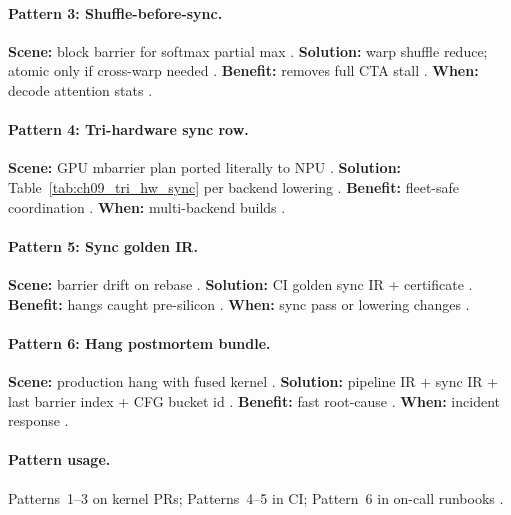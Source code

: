 \paragraph{Pattern 3: Shuffle-before-sync.}
\textbf{Scene:} block barrier for softmax partial max \citep{dao2022flashattention,shah2024flashattention3}.
\textbf{Solution:} warp shuffle reduce; atomic only if cross-warp needed \citep{patel2025llminference,memoryfloor2026}.
\textbf{Benefit:} removes full CTA stall \citep{taxbreak2026,yirage2026}.
\textbf{When:} decode attention stats \citep{kwon2023vllm}.

\paragraph{Pattern 4: Tri-hardware sync row.}
\textbf{Scene:} GPU mbarrier plan ported literally to NPU \citep{amd2024xdna,taxbreak2026}.
\textbf{Solution:} Table~\ref{tab:ch09_tri_hw_sync} per backend lowering \citep{yirage2026,patel2025llminference}.
\textbf{Benefit:} fleet-safe coordination \citep{chen2020compilerbasedhardw,wu2024mirage}.
\textbf{When:} multi-backend builds \citep{mpk2025}.

\paragraph{Pattern 5: Sync golden IR.}
\textbf{Scene:} barrier drift on rebase \citep{yirage2026,shah2024flashattention3}.
\textbf{Solution:} CI golden sync IR + certificate \citep{wu2024mirage,chen2020compilerbasedhardw}.
\textbf{Benefit:} hangs caught pre-silicon \citep{taxbreak2026,mpk2025}.
\textbf{When:} sync pass or lowering changes \citep{nvidia2022hopper,amd2024aie}.

\paragraph{Pattern 6: Hang postmortem bundle.}
\textbf{Scene:} production hang with fused kernel \citep{taxbreak2026,patel2025llminference}.
\textbf{Solution:} pipeline IR + sync IR + last barrier index + CFG bucket id \citep{yirage2026,shah2024flashattention3}.
\textbf{Benefit:} fast root-cause \citep{semianalysis2024tma,chen2020compilerbasedhardw}.
\textbf{When:} incident response \citep{memoryfloor2026,mpk2025}.

\paragraph{Pattern usage.}
Patterns~1--3 on kernel PRs; Patterns~4--5 in CI; Pattern~6 in on-call runbooks \citep{yirage2026,taxbreak2026,shah2024flashattention3,patel2025llminference}.

